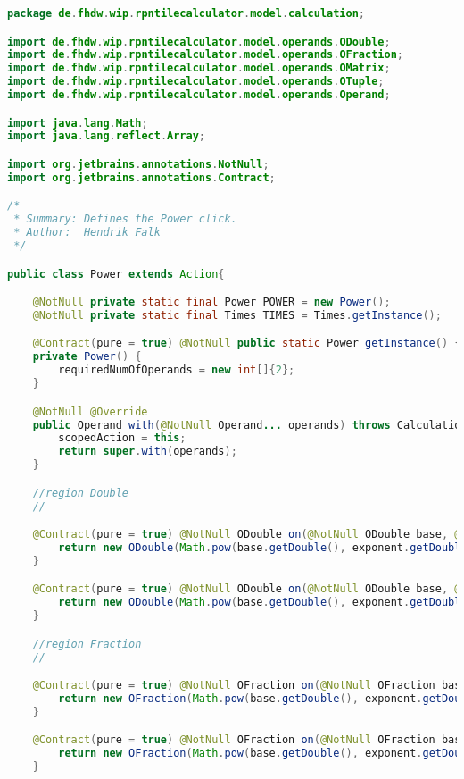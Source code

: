 \begin{lstlisting}[caption=Power (Falk),label=list:Power,language=Java]
package de.fhdw.wip.rpntilecalculator.model.calculation;

import de.fhdw.wip.rpntilecalculator.model.operands.ODouble;
import de.fhdw.wip.rpntilecalculator.model.operands.OFraction;
import de.fhdw.wip.rpntilecalculator.model.operands.OMatrix;
import de.fhdw.wip.rpntilecalculator.model.operands.OTuple;
import de.fhdw.wip.rpntilecalculator.model.operands.Operand;

import java.lang.Math;
import java.lang.reflect.Array;

import org.jetbrains.annotations.NotNull;
import org.jetbrains.annotations.Contract;

/*
 * Summary: Defines the Power click.
 * Author:  Hendrik Falk
 */

public class Power extends Action{

    @NotNull private static final Power POWER = new Power();
    @NotNull private static final Times TIMES = Times.getInstance();

    @Contract(pure = true) @NotNull public static Power getInstance() { return POWER; }
    private Power() {
        requiredNumOfOperands = new int[]{2};
    }

    @NotNull @Override
    public Operand with(@NotNull Operand... operands) throws CalculationException {
        scopedAction = this;
        return super.with(operands);
    }

    //region Double
    //------------------------------------------------------------------------------------

    @Contract(pure = true) @NotNull ODouble on(@NotNull ODouble base, @NotNull ODouble exponent) {
        return new ODouble(Math.pow(base.getDouble(), exponent.getDouble()));
    }

    @Contract(pure = true) @NotNull ODouble on(@NotNull ODouble base, @NotNull OFraction exponent) {
        return new ODouble(Math.pow(base.getDouble(), exponent.getDouble()));
    }

    //region Fraction
    //------------------------------------------------------------------------------------

    @Contract(pure = true) @NotNull OFraction on(@NotNull OFraction base, @NotNull ODouble exponent){
        return new OFraction(Math.pow(base.getDouble(), exponent.getDouble()));
    }

    @Contract(pure = true) @NotNull OFraction on(@NotNull OFraction base, @NotNull OFraction exponent){
        return new OFraction(Math.pow(base.getDouble(), exponent.getDouble()));
    }


\end{lstlisting}
